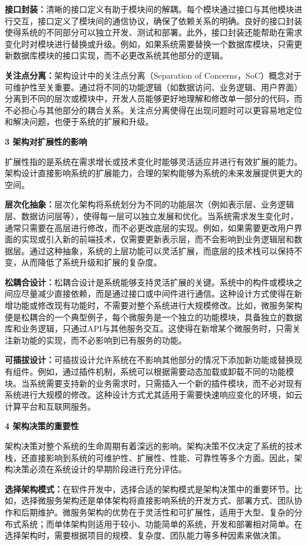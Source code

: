 \textbf{接口封装：}清晰的接口定义有助于模块间的解耦。每个模块通过接口与其他模块进行交互，接口定义了模块间的通信协议，确保了依赖关系的明确。良好的接口封装使得系统的不同部分可以独立开发、测试和部署。此外，接口封装还能帮助在需求变化时对模块进行替换或升级。例如，如果系统需要替换一个数据库模块，只需更新数据库模块的接口实现，而不必更改系统其他部分的逻辑。

\textbf{关注点分离：}架构设计中的关注点分离（Separation of Concerns，SoC）概念对于可维护性至关重要。通过将不同的功能逻辑（如数据访问、业务逻辑、用户界面）分离到不同的层次或模块中，开发人员能够更好地理解和修改单一部分的代码，而不必担心与其他部分的耦合关系。关注点分离使得在出现问题时可以更容易地定位和解决问题，也便于系统的扩展和升级。

\textbf{3 架构对扩展性的影响}

扩展性指的是系统在需求增长或技术变化时能够灵活适应并进行有效扩展的能力。架构设计直接影响系统的扩展能力，合理的架构能够为系统的未来发展提供更大的空间。

\textbf{层次化抽象：}层次化架构将系统划分为不同的功能层次（例如表示层、业务逻辑层、数据访问层等），使得每一层可以独立发展和优化。当系统需求发生变化时，通常只需要在高层进行修改，而不必更改底层的实现。例如，如果需要更改用户界面的实现或引入新的前端技术，仅需要更新表示层，而不会影响到业务逻辑层和数据层。通过这种抽象，系统的上层功能可以灵活扩展，而底层的技术栈可以保持不变，从而降低了系统升级和扩展的复杂度。

\textbf{松耦合设计：}松耦合设计是系统能够支持灵活扩展的关键。系统中的构件或模块之间应尽量减少直接依赖，而是通过接口或中间件进行通信。这种设计方式使得在新增功能或修改现有功能时，不需要对整个系统进行大规模修改。比如，微服务架构便是松耦合的一个典型例子，每个微服务是一个独立的功能模块，具备独立的数据库和业务逻辑，只通过API与其他服务交互。这使得在新增某个微服务时，只需关注新功能的实现，而不必影响到已有服务的功能。

\textbf{可插拔设计：}可插拔设计允许系统在不影响其他部分的情况下添加新功能或替换现有组件。例如，通过插件机制，系统可以根据需要动态加载或卸载不同的功能模块。当系统需要支持新的业务需求时，只需插入一个新的插件模块，而不必对现有系统进行大规模的修改。这种设计方式尤其适用于需要快速响应变化的环境，如云计算平台和互联网服务。

\textbf{4 架构决策的重要性}

架构决策对整个系统的生命周期有着深远的影响。架构决策不仅决定了系统的技术栈，还直接影响到系统的可维护性、扩展性、性能、可靠性等多个方面。因此，架构决策必须在系统设计的早期阶段进行充分评估。

\textbf{选择架构模式：}在软件开发中，选择合适的架构模式是架构决策中的重要环节。比如，选择微服务架构还是单体架构将直接影响系统的开发方式、部署方式、团队协作和后期维护。微服务架构的优势在于灵活性和可扩展性，适用于大型、复杂的分布式系统；而单体架构则适用于较小、功能简单的系统，开发和部署相对简单。在选择架构时，需要根据项目的规模、复杂度、团队能力等多种因素来做决策。


